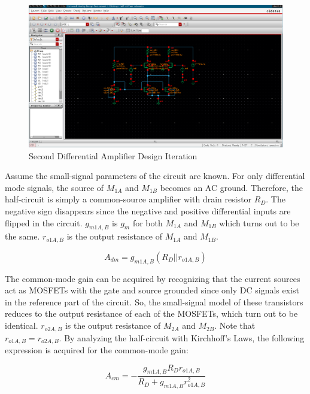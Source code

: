 \FloatBarrier

\begin{figure}[h!]
	\centering
	\includegraphics[scale=0.35]{../images/diff_amp_2.PNG}
	\caption{Second Differential Amplifier Design Iteration}
	\label{fig:diff_amp_2}
\end{figure}

\FloatBarrier

Assume the small-signal parameters of the circuit are known.
For only differential mode signals, the source of $M_{1A}$ and $M_{1B}$ becomes an AC ground.
Therefore, the half-circuit is simply a common-source amplifier with drain resistor $R_{D}$.
The negative sign disappears since the negative and positive differential inputs are flipped in the circuit.
$g_{m1A,B}$ is $g_{m}$ for both $M_{1A}$ and $M_{1B}$ which turns out to be the same.
$r_{o1A,B}$ is the output resistance of $M_{1A}$ and $M_{1B}$.

\begin{equation}
	\label{eq:dm_gain}
	A_{dm} = g_{m1A,B} ( R_{D} || r_{o1A,B} )
\end{equation}

The common-mode gain can be acquired by recognizing that the current sources act as MOSFETs with the gate and source grounded since only DC signals exist in the reference part of the circuit.
So, the small-signal model of these transistors reduces to the output resistance of each of the MOSFETs, which turn out to be identical.
$r_{o2A,B}$ is the output resistance of $M_{2A}$ and $M_{2B}$.
Note that $r_{o1A,B} = r_{o2A,B}$.
By analyzing the half-circuit with Kirchhoff's Laws, the following expression is acquired for the common-mode gain:

\begin{equation}
	\label{eq:cm_gain}
	A_{cm} = - \frac{ g_{m1A,B} R_{D} r_{o1A,B} }{ R_{D} + g_{m1A,B} r_{o1A,B}^{2} }
\end{equation}

